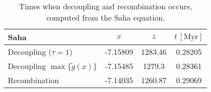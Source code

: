 \begin{table}[h]
\centering
\caption{Times when decoupling and recombination occurs, computed from the Saha equation.}
\label{tab:M2:results:rec_and_dec_time_table_Saha}
\begin{tabular}{l|ccc}
\toprule
                               Saha &      $x$ &     $z$ & $t\,\mathrm{[Myr]}$ \\
\midrule
              Decoupling ($\tau=1$) & -7.15809 & 1283.46 &             0.28205 \\
Decoupling $\max\{ \tilde{g}(x) \}$ & -7.15485 &  1279.3 &             0.28361 \\
                      Recombination & -7.14035 & 1260.87 &             0.29069 \\
\bottomrule
\end{tabular}
\end{table}
